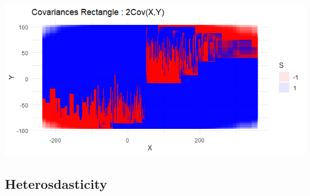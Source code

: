 \documentclass[
]{report}
\begin{document}
\begin{minipage}{0.45\textwidth}
\centering
    \includegraphics{graph_rect_heterogene.png}
\end{minipage}

\hypertarget{heterosdasticity}{%
\subsection{Heterosdasticity}\label{heterosdasticity}}
\end{document}
